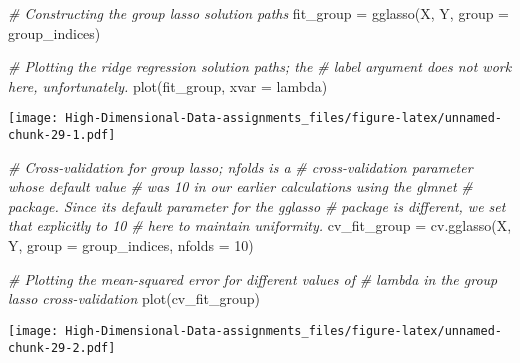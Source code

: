 \documentclass[
]{book}
\newenvironment{Shaded}{\begin{snugshade}}{\end{snugshade}}
\newcommand{\AttributeTok}[1]{\textcolor[rgb]{0.77,0.63,0.00}{#1}}
\newcommand{\CommentTok}[1]{\textcolor[rgb]{0.56,0.35,0.01}{\textit{#1}}}
\newcommand{\DecValTok}[1]{\textcolor[rgb]{0.00,0.00,0.81}{#1}}
\newcommand{\FunctionTok}[1]{\textcolor[rgb]{0.00,0.00,0.00}{#1}}
\newcommand{\NormalTok}[1]{#1}
\newcommand{\OtherTok}[1]{\textcolor[rgb]{0.56,0.35,0.01}{#1}}
\newcommand{\SpecialCharTok}[1]{\textcolor[rgb]{0.00,0.00,0.00}{#1}}
\newcommand{\StringTok}[1]{\textcolor[rgb]{0.31,0.60,0.02}{#1}}
\begin{document}
\begin{Shaded}
\begin{Highlighting}[]
\CommentTok{\# Constructing the group lasso solution paths}
\NormalTok{fit\_group }\OtherTok{=} \FunctionTok{gglasso}\NormalTok{(X, Y, }\AttributeTok{group =}\NormalTok{ group\_indices)}

\CommentTok{\# Plotting the ridge regression solution paths; the}
\CommentTok{\# \textquotesingle{}label\textquotesingle{} argument does not work here, unfortunately.}
\FunctionTok{plot}\NormalTok{(fit\_group, }\AttributeTok{xvar =} \StringTok{\textquotesingle{}lambda\textquotesingle{}}\NormalTok{)}
\end{Highlighting}
\end{Shaded}

\texttt{[image: High-Dimensional-Data-assignments\_files/figure-latex/unnamed-chunk-29-1.pdf]}

\begin{Shaded}
\begin{Highlighting}[]
\CommentTok{\# Cross{-}validation for group lasso; \textquotesingle{}nfolds\textquotesingle{} is a}
\CommentTok{\# cross{-}validation parameter whose default value}
\CommentTok{\# was 10 in our earlier calculations using the \textquotesingle{}glmnet\textquotesingle{}}
\CommentTok{\# package. Since its default parameter for the \textquotesingle{}gglasso\textquotesingle{}}
\CommentTok{\# package is different, we set that explicitly to 10}
\CommentTok{\# here to maintain uniformity.}
\NormalTok{cv\_fit\_group }\OtherTok{=} \FunctionTok{cv.gglasso}\NormalTok{(X, Y, }\AttributeTok{group =}\NormalTok{ group\_indices,}
                          \AttributeTok{nfolds =} \DecValTok{10}\NormalTok{)}

\CommentTok{\# Plotting the mean{-}squared error for different values of}
\CommentTok{\# lambda in the group lasso cross{-}validation}
\FunctionTok{plot}\NormalTok{(cv\_fit\_group)}
\end{Highlighting}
\end{Shaded}

\texttt{[image: High-Dimensional-Data-assignments\_files/figure-latex/unnamed-chunk-29-2.pdf]}

\begin{Shaded}
\end{Shaded}
\end{document}
